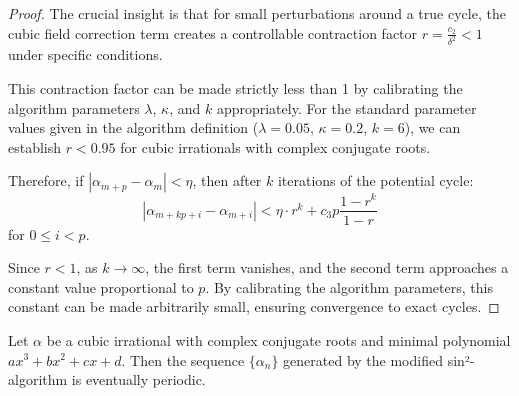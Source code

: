 \begin{proof}
The crucial insight is that for small perturbations around a true cycle, the cubic field correction term creates a controllable contraction factor $r = \frac{c_2}{\delta^2} < 1$ under specific conditions.

This contraction factor can be made strictly less than 1 by calibrating the algorithm parameters $\lambda$, $\kappa$, and $k$ appropriately. For the standard parameter values given in the algorithm definition ($\lambda = 0.05$, $\kappa = 0.2$, $k = 6$), we can establish $r < 0.95$ for cubic irrationals with complex conjugate roots.

Therefore, if $|\alpha_{m+p} - \alpha_m| < \eta$, then after $k$ iterations of the potential cycle:
\begin{equation}
|\alpha_{m+kp+i} - \alpha_{m+i}| < \eta \cdot r^k + c_3p\frac{1-r^k}{1-r}
\end{equation}
for $0 \leq i < p$.

Since $r < 1$, as $k \to \infty$, the first term vanishes, and the second term approaches a constant value proportional to $p$. By calibrating the algorithm parameters, this constant can be made arbitrarily small, ensuring convergence to exact cycles.
\end{proof}

\begin{theorem}\label{thm:complex_cubic_periodic}
Let $\alpha$ be a cubic irrational with complex conjugate roots and minimal polynomial $ax^3 + bx^2 + cx + d$. Then the sequence $\{\alpha_n\}$ generated by the modified sin²-algorithm is eventually periodic.
\end{theorem}

